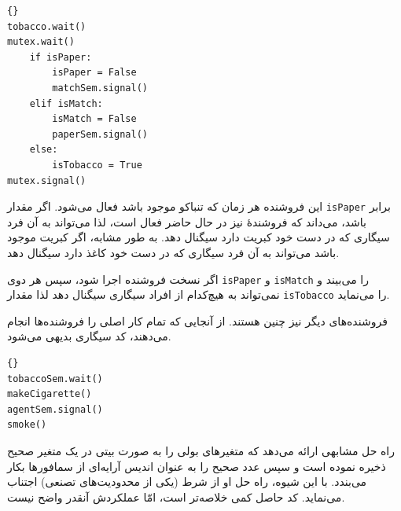 \documentclass{book}
\begin{document}
\begin{latin}
\begin{latin}
\begin{lstlisting}[title=\rl{فروشنده \lr{A}}]{}
tobacco.wait()
mutex.wait()
    if isPaper:
        isPaper = False
        matchSem.signal()
    elif isMatch:
        isMatch = False
        paperSem.signal()
    else: 
        isTobacco = True
mutex.signal()
\end{lstlisting}
\end{latin}
\end{latin}

    این فروشنده هر زمان که تنباکو موجود باشد فعال می‌شود. اگر مقدار {\tt isPaper} برابر  باشد، می‌داند که فروشندهٔ‌  نیز در حال 
    حاضر فعال است، لذا می‌تواند به آن فرد سیگاری که در دست خود کبریت دارد سیگنال دهد. به طور مشابه، اگر کبریت موجود باشد می‌تواند به آن فرد 
    سیگاری که در دست خود کاغذ دارد سیگنال دهد. 

    اگر نسخت فروشنده  اجرا شود، سپس هر دوی {\tt isPaper} و  {\tt isMatch}  را  می‌بیند و نمی‌تواند به هیچ‌کدام از افراد 
    سیگاری سیگنال دهد لذا مقدار  {\tt isTobacco} را   می‌نماید. 

    فروشنده‌های دیگر نیز چنین هستند. از آنجایی که  تمام کار اصلی را فروشنده‌ها انجام می‌دهند، کد سیگاری بدیهی می‌شود.

\begin{latin}
\begin{latin}
\begin{lstlisting}[title=\rl{فرد سیگاری با تنباکو}]{}
tobaccoSem.wait()
makeCigarette()
agentSem.signal()
smoke()
\end{lstlisting}
\end{latin}
\end{latin}

    راه حل مشابهی ارائه می‌دهد که متغیرهای بولی را به صورت بیتی در یک متغیر صحیح ذخیره نموده است و سپس عدد صحیح را به عنوان 
    اندیس آرایه‌ای از سمافورها بکار می‌بندد. با این شیوه، راه حل او از شرط (یکی از محدودیت‌های تصنعی) اجتناب می‌نماید. 
    کد حاصل کمی خلاصه‌تر است، امّا عملکردش آنقدر واضح نیست. 
    
\end{document}

